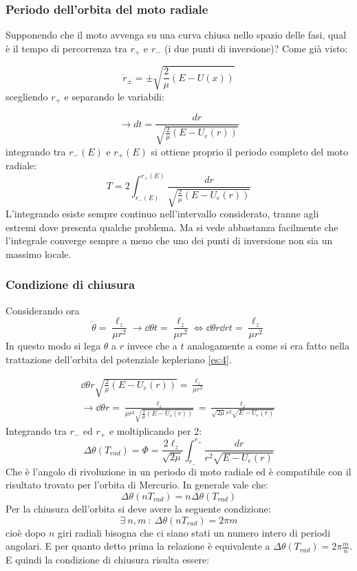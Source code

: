 \documentclass[Main.tex]{subfiles}
\begin{document}
\subsubsection{Periodo dell'orbita del moto radiale}
Supponendo che il moto avvenga su una curva chiusa nello spazio delle fasi, qual è il tempo di percorrenza tra $r_+$ e $r_-$ (i due punti di inversione)? Come già visto:

$$\dot r_\pm=  \pm \sqrt{\frac{2}{\mu}(E-U(x))}$$
scegliendo $r_+$ e separando le variabili:

$$
\longrightarrow dt = \frac{dr}{\sqrt{\frac{2}{\mu} (E-U_e(r))}}
$$
integrando tra $r_-(E)$ e $r_+(E)$ si ottiene proprio il periodo completo del moto radiale:
\begin{equation}
T= 2 \int_{r_-(E)}^{r_+(E)} \frac{dr}{\sqrt{\frac{2}{\mu}(E-U_e(r))}}
\end{equation}
L'integrando esiste sempre continuo nell'intervallo considerato, tranne agli estremi dove presenta qualche problema. Ma si vede abbastanza facilmente che l'integrale converge sempre a meno che uno dei punti di inversione non sia un massimo locale.

\subsubsection{Condizione di chiusura}
Considerando ora 
\begin{equation}
	\dot \theta = \frac{\ell_z}{\mu r^2} \rightarrow \dd{\theta}{t} = \frac{\ell_z}{\mu r^2} \iff \dd{\theta}{r} \dd{r}{t} = \frac{\ell_z}{\mu r^2}
\end{equation}
In questo modo si lega $\theta$ a $r$ invece che a $t$ analogamente a come si era fatto nella trattazione dell'orbita del potenziale kepleriano \underline{\ref{es:4}}.

\begin{gather}
	\dd{\theta}{r} \sqrt{\frac{2}{\mu} (E-U_e(r))} = \frac{\ell_z}{\mu r^2}\\
	\rightarrow \dd{\theta}{r} = \frac{\ell_z}{\mu r^2 \sqrt{ \frac{2}{\mu}(E-U_e(r))}} = \frac{\ell_z}{ \sqrt{2 \mu} r^2 \sqrt{E - U_e(r)}}
\end{gather}
Integrando tra $r_-$ ed $r_+$ e moltiplicando per 2:
\begin{equation}
	\Delta \theta (T_{rad})= \Phi = \frac{2 \ell_z}{\sqrt{2 \mu}} \int_{r_-}^{r_+} \frac{dr}{r^2 \sqrt{E-U_e(r)}}
\end{equation}
Che è l'angolo di rivoluzione in un periodo di moto radiale ed è compatibile con il risultato trovato per l'orbita di Mercurio. In generale vale che: 
\begin{equation}
	\Delta \theta (n T_{rad}) = n \Delta \theta (T_{rad})
\end{equation}
Per la chiusura dell'orbita si deve avere la seguente condizione: 
\begin{equation}
	\exists \ n,m \ : \ \Delta \theta(nT_{rad}) = 2 \pi m
\end{equation}
cioè dopo $n$ giri radiali bisogna che ci siano stati un numero intero di periodi angolari. E per quanto detto prima la relazione è equivalente a $\Delta \theta (T_{rad})= 2 \pi \frac{m}{n}$. E quindi la condizione di chiusura risulta essere:
\end{document}
